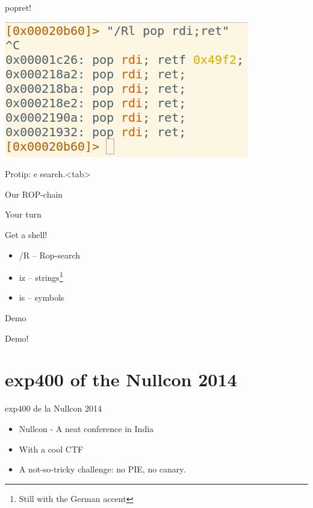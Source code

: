 \documentclass{beamer}
\begin{document}
\begin{frame}{popret!}
    \begin{center}
        \includegraphics[width=.7\textwidth]{r0pbaby_popret.png}
    \end{center}
    \begin{center}
        Protip: \alert{e search.<tab>}
    \end{center}
\end{frame}

\begin{frame}{Our ROP-chain}
\end{frame}

\begin{frame}{Your turn}
    \begin{center}
        \Large Get a shell!
    \end{center}
    \begin{itemize}
        \item \alert{/R}  -- Rop-search
        \item \alert{iz}  -- strings\footnote{Still with the German accent}
        \item \alert{is}  -- symbols
    \end{itemize}
\end{frame}

\begin{frame}{Demo}
    \begin{center}
        \Large Demo!
    \end{center}
\end{frame}


\section{exp400 of the Nullcon 2014}
\begin{frame}{exp400 de la Nullcon 2014}
    \begin{itemize}
        \item Nullcon - A neat conference in India
        \item With a cool CTF
        \item A not-so-tricky challenge: no PIE, no canary.
    \end{itemize}
\end{frame}
\end{document}
